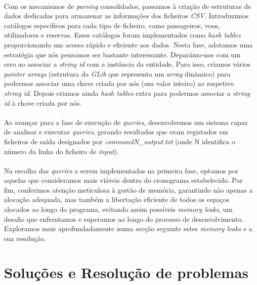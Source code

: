 \documentclass{article}
\begin{document}
\paragraph{}Com os mecanismos de \textit{parsing} consolidados, passamos à criação de estruturas de dados dedicadas para armazenar as informações dos ficheiros \textit{CSV}. Introduzimos catálogos específicos para cada tipo de ficheiro, como passageiros, voos, utilizadores e reservas. Esses catálogos foram implementados como \textit{hash tables} proporcionando um acesso rápido e eficiente aos dados. Nesta fase, adotamos uma estratégia que nós pensamos ser bastante interessante. Deparámo-nos com um erro ao associar a  \textit{string id} com a instância da entidade. Para isso, criamos vários \textit{pointer arrays} (estrutura da \textit{GLib} que representa um \textit{array} dinâmico) para podermos associar uma chave criada por nós (um valor inteiro) ao respetivo \textit{string id}. Depois criamos ainda \textit{hash tables} extra para podermos associar a \textit{string id} à chave criada por nós.

\paragraph{}Ao avançar para a fase de execução de \textit{queries}, desenvolvemos um sistema capaz de analisar e executar \textit{queries}, gerando resultados que eram registados em ficheiros de saída designados por \textit{commandN\_output.txt} (onde N identifica o número da linha do ficheiro de \textit{input}). 

\paragraph{}Na escolha das \textit{queries} a serem implementadas na primeira fase, optamos por aquelas que consideramos mais viáveis dentro do cronograma estabelecido. Por fim, conferimos atenção meticulosa à gestão de memória, garantindo não apenas a alocação adequada, mas também a libertação eficiente de todos os espaços alocados ao longo do programa, evitando assim possíveis \textit{memory leaks}, um desafio que enfrentamos e superamos ao longo do processo de desenvolvimento. Exploramos mais aprofundadamente numa secção seguinte estes \textit{memory leaks} e a sua resolução.

\section{Soluções e Resolução de problemas}
\end{document}
